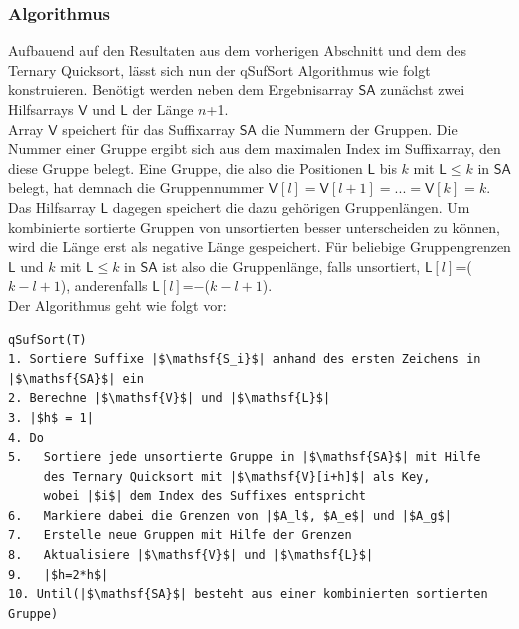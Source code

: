  \subsubsection{Algorithmus}
Aufbauend auf den Resultaten aus dem vorherigen Abschnitt und dem des Ternary Quicksort, lässt sich nun der qSufSort Algorithmus wie folgt konstruieren.
Benötigt werden neben dem Ergebnisarray $\mathsf{SA}$ zunächst zwei Hilfsarrays $\mathsf{V}$ und $\mathsf{L}$ der Länge $n$+1.\\
Array $\mathsf{V}$ speichert für das Suffixarray $\mathsf{SA}$ die Nummern der Gruppen. Die Nummer einer Gruppe ergibt sich aus dem maximalen Index im Suffixarray, den diese Gruppe belegt. Eine Gruppe, die also die Positionen $\mathsf{L}$ bis $k$ mit $\mathsf{L} \leq k$ in $\mathsf{SA}$ belegt, hat demnach die Gruppennummer $\mathsf{V}[l]=\mathsf{V}[l+1]=...=\mathsf{V}[k]=k$.\\
Das Hilfsarray $\mathsf{L}$ dagegen speichert die dazu gehörigen Gruppenlängen. Um kombinierte sortierte Gruppen von unsortierten besser unterscheiden zu können, wird die Länge erst als negative Länge gespeichert. Für beliebige Gruppengrenzen $\mathsf{L}$ und $k$ mit $\mathsf{L} \leq k$ in $\mathsf{SA}$ ist also die Gruppenlänge, falls unsortiert, $\mathsf{L}[l]$=($k-l+1$), anderenfalls $\mathsf{L}[l]$=$-$($k-l+1$). \\
Der Algorithmus geht wie folgt vor:\\

\begin{verbatim}
qSufSort(T)
1. Sortiere Suffixe |$\mathsf{S_i}$| anhand des ersten Zeichens in |$\mathsf{SA}$| ein 
2. Berechne |$\mathsf{V}$| und |$\mathsf{L}$|
3. |$h$ = 1|
4. Do  
5.   Sortiere jede unsortierte Gruppe in |$\mathsf{SA}$| mit Hilfe
     des Ternary Quicksort mit |$\mathsf{V}[i+h]$| als Key,
     wobei |$i$| dem Index des Suffixes entspricht
6.   Markiere dabei die Grenzen von |$A_l$, $A_e$| und |$A_g$|
7.   Erstelle neue Gruppen mit Hilfe der Grenzen
8.   Aktualisiere |$\mathsf{V}$| und |$\mathsf{L}$|
9.   |$h=2*h$|
10. Until(|$\mathsf{SA}$| besteht aus einer kombinierten sortierten Gruppe)
\end{verbatim}

